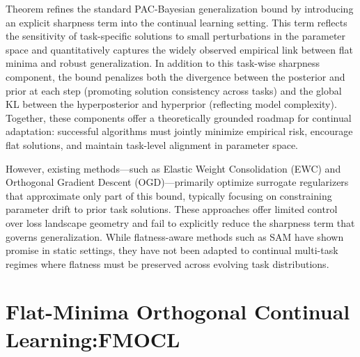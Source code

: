 \documentclass[letterpaper]{article} %
\begin{document}

Theorem  refines the standard PAC-Bayesian generalization bound by introducing an explicit sharpness term into the continual learning setting. This term reflects the sensitivity of task-specific solutions to small perturbations in the parameter space and quantitatively captures the widely observed empirical link between flat minima and robust generalization. In addition to this task-wise sharpness component, the bound penalizes both the divergence between the posterior and prior at each step (promoting solution consistency across tasks) and the global KL between the hyperposterior and hyperprior (reflecting model complexity). Together, these components offer a theoretically grounded roadmap for continual adaptation: successful algorithms must jointly minimize empirical risk, encourage flat solutions, and maintain task-level alignment in parameter space.

However, existing methods—such as Elastic Weight Consolidation (EWC) and Orthogonal Gradient Descent (OGD)—primarily optimize surrogate regularizers that approximate only part of this bound, typically focusing on constraining parameter drift to prior task solutions. These approaches offer limited control over loss landscape geometry and fail to explicitly reduce the sharpness term that governs generalization. While flatness-aware methods such as SAM have shown promise in static settings, they have not been adapted to continual multi-task regimes where flatness must be preserved across evolving task distributions.

\section{Flat-Minima Orthogonal Continual Learning:FMOCL}
\label{sec:flatness-lora-method}
\end{document}
